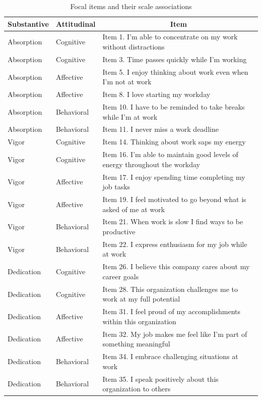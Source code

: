 \documentclass[
  english,
  man]{apa6}
\begin{document}
\begin{table}[tbp]

\begin{center}
\begin{threeparttable}

\caption{\label{tab:itemtable}Focal items and their scale associations}

\begin{tabular}{lll}
\toprule
Substantive & \multicolumn{1}{c}{Attitudinal} & \multicolumn{1}{c}{Item}\\
\midrule
Absorption & Cognitive & Item 1. I'm able to concentrate on my work without distractions\\
Absorption & Cognitive & Item 3. Time passes quickly while I'm working\\
Absorption & Affective & Item 5. I enjoy thinking about work even when I'm not at work\\
Absorption & Affective & Item 8. I love starting my workday\\
Absorption & Behavioral & Item 10. I have to be reminded to take breaks while I'm at work\\
Absorption & Behavioral & Item 11. I never miss a work deadline\\
Vigor & Cognitive & Item 14. Thinking about work saps my energy\\
Vigor & Cognitive & Item 16. I'm able to maintain good levels of energy throughout the workday\\
Vigor & Affective & Item 17. I enjoy spending time completing my job tasks\\
Vigor & Affective & Item 19. I feel motivated to go beyond what is asked of me at work\\
Vigor & Behavioral & Item 21. When work is slow I find ways to be productive\\
Vigor & Behavioral & Item 22. I express enthusiasm for my job while at work\\
Dedication & Cognitive & Item 26. I believe this company cares about my career goals\\
Dedication & Cognitive & Item 28. This organization challenges me to work at my full potential\\
Dedication & Affective & Item 31. I feel proud of my accomplishments within this organization\\
Dedication & Affective & Item 32. My job makes me feel like I'm part of something meaningful\\
Dedication & Behavioral & Item 34. I embrace challenging situations at work\\
Dedication & Behavioral & Item 35. I speak positively about this organization to others\\
\bottomrule
\end{tabular}

\end{threeparttable}
\end{center}

\end{table}
\end{document}
